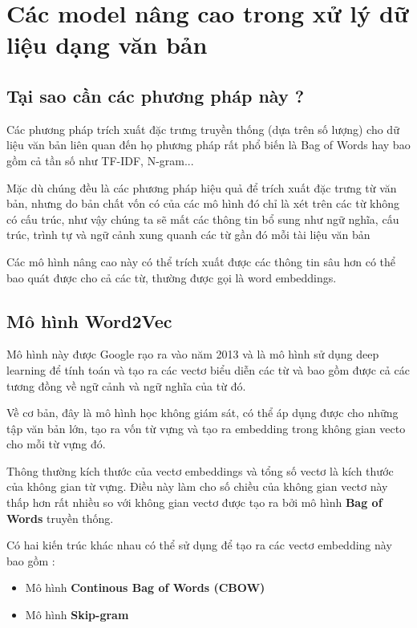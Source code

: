 \chapter{Các model nâng cao trong xử lý dữ liệu dạng văn bản}
\label{Chapter4}
\section{Tại sao cần các phương pháp này ?}

Các phương pháp trích xuất đặc trưng truyền thống (dựa trên số lượng) cho dữ liệu văn bản liên quan đến họ phương pháp rất phổ biến là Bag of Words hay bao gồm cả tần số như TF-IDF, N-gram... 

Mặc dù chúng đều là các phương pháp hiệu quả để trích xuất đặc trưng từ văn bản, nhưng do bản chất vốn có của các mô hình đó chỉ là xét trên các từ không có cấu trúc, như vậy chúng ta sẽ mất các thông tin bổ sung như ngữ nghĩa, cấu trúc, trình tự và ngữ cảnh xung quanh các từ gần đó mỗi tài liệu văn bản

Các mô hình nâng cao này có thể trích xuất được các thông tin sâu hơn có thể bao quát được cho cả các từ, thường được gọi là word embeddings.

\section{Mô hình Word2Vec}
Mô hình này được Google rạo ra vào năm 2013 và là mô hình sử dụng deep learning để tính toán và tạo ra các vectơ biểu diễn các từ và bao gồm được cả các tương đồng về ngữ cảnh và ngữ nghĩa của từ đó.

Về cơ bản, đây là mô hình học không giám sát, có thể áp dụng được cho những tập văn bản lớn, tạo ra vốn từ vựng và tạo ra embedding trong không gian vecto cho mỗi từ vựng đó.

Thông thường kích thước của vectơ embeddings và tổng số vectơ là kích thước của không gian từ vựng. Điều này làm cho số chiều của không gian vectơ này thấp hơn rất nhiều so với không gian vectơ được tạo ra bởi mô hình \textbf{Bag of Words} truyền thống.

Có hai kiến trúc khác nhau có thể sử dụng để tạo ra các vectơ embedding này bao gồm \cite{WEBSITE:17} \cite{WEBSITE:18}:
\begin{itemize}
	\item Mô hình \textbf{Continous Bag of Words (CBOW)}
	\item Mô hình \textbf{Skip-gram}
\end{itemize} 


